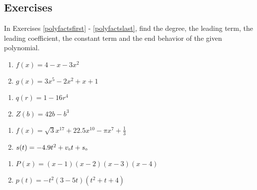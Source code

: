 \subsection{Exercises}

In Exercises \ref{polyfactsfirst} - \ref{polyfactslast}, find the degree, the leading term, the leading coefficient, the constant term and the end behavior of the given polynomial.

\begin{multicols}{2}
\begin{enumerate}

\item  $f(x) = 4-x-3x^2$ \label{polyfactsfirst}
\item  $g(x) = 3x^5 - 2x^2 + x + 1$

\setcounter{HW}{\value{enumi}}
\end{enumerate}
\end{multicols}

\begin{multicols}{2}
\begin{enumerate}
\setcounter{enumi}{\value{HW}}

\item $q(r) = 1 - 16r^{4}$
\item $Z(b) = 42b - b^{3}$

\setcounter{HW}{\value{enumi}}
\end{enumerate}
\end{multicols}

\begin{multicols}{2}
\begin{enumerate}
\setcounter{enumi}{\value{HW}}

\item $f(x) = \sqrt{3}x^{17} + 22.5x^{10} - \pi x^{7} + \frac{1}{3}$
\item $s(t) = -4.9t^{2} + v_{\mbox{\tiny $0$}}t + s_{\mbox{\tiny $0$}}$

\setcounter{HW}{\value{enumi}}
\end{enumerate}
\end{multicols}

\begin{multicols}{2}
\begin{enumerate}
\setcounter{enumi}{\value{HW}}

\item $P(x) = (x - 1)(x - 2)(x - 3)(x - 4)$
\item $p(t) = -t^2(3 - 5t)(t^{2} + t + 4)$

\setcounter{HW}{\value{enumi}}
\end{enumerate}
\end{multicols}

